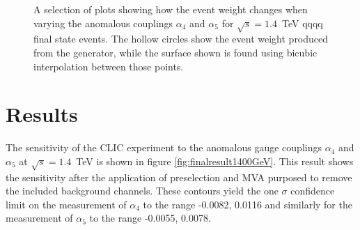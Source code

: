 \begin{figure}[h!]
\caption[A selection of plots showing how the event weight changes when varying the anomalous couplings $\alpha_{4}$ and $\alpha_{5}$ for $\sqrt{s}=1.4$~TeV \nu{\nu}qqqq final state events.  The hollow circles show the event weight produced from the generator, while the surface shown is found using bicubic interpolation between those points.]{A selection of plots showing how the event weight changes when varying the anomalous couplings $\alpha_{4}$ and $\alpha_{5}$ for $\sqrt{s}=1.4$~TeV \nu{\nu}qqqq final state events.  The hollow circles show the event weight produced from the generator, while the surface shown is found using bicubic interpolation between those points.}
\label{fig:eventweights1400interpolated}
\end{figure}


\section{Results}
The sensitivity of the CLIC experiment to the anomalous gauge couplings $\alpha_{4}$ and $\alpha_{5}$ at $\sqrt{s}=1.4$~TeV is shown in figure \ref{fig:finalresult1400GeV}.  This result shows the sensitivity after the application of preselection and MVA purposed to remove the included background channels.  These contours yield the one $\sigma$ confidence limit on the measurement of $\alpha_{4}$ to the range -0.0082, 0.0116 and similarly for the measurement of $\alpha_{5}$ to the range -0.0055, 0.0078.

